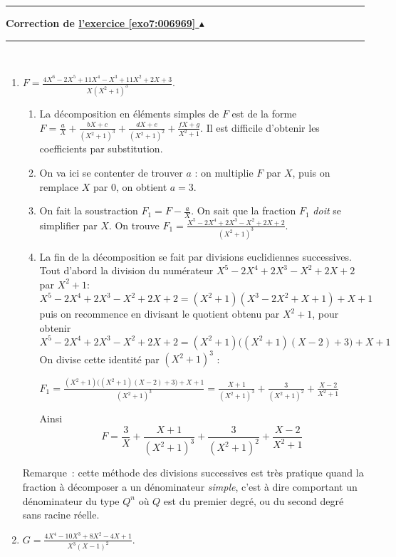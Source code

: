 \documentclass[11pt,a4paper]{article}
\newcounter{exo}
\newcommand{\correction}[1]{\hypertarget{cor7:#1}{}\label{cor7:#1}{\bf Correction de \hyperlink{exo7:#1}{l'exercice \ref{exo7:#1} $\blacktriangle$}}\vspace{1mm}\hrule\vspace{1mm}}
\newcommand{\fincorrection}{\vspace{1mm}\hrule\vspace*{7mm}}
\begin{document}
\fincorrection
\correction{006969}\ 
\begin{enumerate}
\item $F=\frac{4X^6-2X^5+11X^4-X^3+11X^2+2X+3}{X(X^2+1)^3}$.

  \begin{enumerate}
  \item 
La décomposition en éléments simples de $F$ est de la forme
$F=\frac{a}{X}+\frac{bX+c}{(X^2+1)^3}+\frac{dX+e}{(X^2+1)^2}+\frac{fX+g}{X^2+1}$.
Il est difficile d'obtenir les coefficients par substitution.

  \item
On va ici se contenter de trouver $a$ :
on multiplie $F$ par $X$, puis on remplace $X$ par $0$, on obtient $a=3$.

  \item On fait la soustraction $F_1=F-\frac{a}{X}$. 
  On sait que la fraction $F_1$ \emph{doit} se simplifier par $X$. 
  On trouve $F_1=\frac{X^5-2X^4+2X^3-X^2+2X+2}{(X^2+1)^3}$.
  
  \item La fin de la décomposition se fait par divisions euclidiennes successives.
  Tout d'abord la division du numérateur $X^5-2X^4+2X^3-X^2+2X+2$
par $X^2+1$:
$$X^5-2X^4+2X^3-X^2+2X+2=(X^2+1)(X^3-2X^2+X+1)+X+1$$
puis on recommence en divisant le quotient obtenu par $X^2+1$, pour obtenir 
$$X^5-2X^4+2X^3-X^2+2X+2=(X^2+1)\big((X^2+1)(X-2)+3\big)+X+1$$
On divise cette identité par $(X^2+1)^3$ :

$F_1 = \frac{(X^2+1)\big((X^2+1)(X-2)+3\big)+X+1}{(X^2+1)^3} 
= \frac{X+1}{(X^2+1)^3}+\frac{3}{(X^2+1)^2}+\frac{X-2}{X^2+1}$

Ainsi 
$$F=
\frac{3}{X}+\frac{X+1}{(X^2+1)^3}+\frac{3}{(X^2+1)^2}+\frac{X-2}{X^2+1}$$
  \end{enumerate}
  
\smallskip
Remarque~: cette méthode des divisions successives est tr\`es pratique quand
la fraction \`a décomposer a un dénominateur \emph{simple}, c'est \`a dire
comportant un dénominateur du type $Q^n$ o\`u $Q$ est du premier degré, ou
du second degré sans racine réelle. 

\item $G=\frac{4X^4-10X^3+8X^2-4X+1}{X^3(X-1)^2}$.


\end{enumerate}
\end{document}
